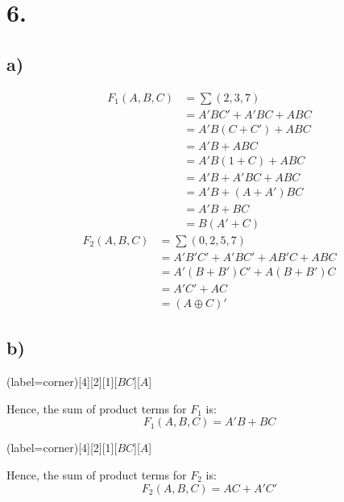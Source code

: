 \documentclass[a4paper,12pt]{article}
\begin{document}
\section*{6.}

\subsection*{a)}
\begin{align*}
	F_1(A,B,C) &= \sum (2,3,7)\\
	&= A'BC'+A'BC+ABC\\
	&= A'B(C+C')+ABC\\
	&= A'B+ABC\\
	&= A'B(1+C)+ABC\\
	&= A'B+A'BC+ABC\\
	&= A'B+(A+A')BC\\
	&= A'B+BC\\
	&= \boxed{B(A'+C)}
\end{align*}
\begin{align*}
	F_2(A,B,C) &= \sum (0,2,5,7)\\
	&= A'B'C'+A'BC'+AB'C+ABC\\
	&= A'(B+B')C'+A(B+B')C\\
	&= A'C'+AC\\
	&= \boxed{(A\oplus C)'}
\end{align*}

\subsection*{b)}
\begin{center}
	\begin{karnaugh-map}(label=corner)[4][2][1][$BC$][$A$]
		\autoterms[0]
	\end{karnaugh-map}
\end{center}
Hence, the sum of product terms for $F_1$ is: 
\begin{equation*}
	\boxed{F_1(A,B,C) = A'B+BC}
\end{equation*}

\begin{center}
	\begin{karnaugh-map}(label=corner)[4][2][1][$BC$][$A$]
		\autoterms[0]
	\end{karnaugh-map}
\end{center}
Hence, the sum of product terms for $F_2$ is:
\begin{equation*}
	\boxed{F_2(A,B,C) = AC+A'C'}
\end{equation*}
\end{document}
